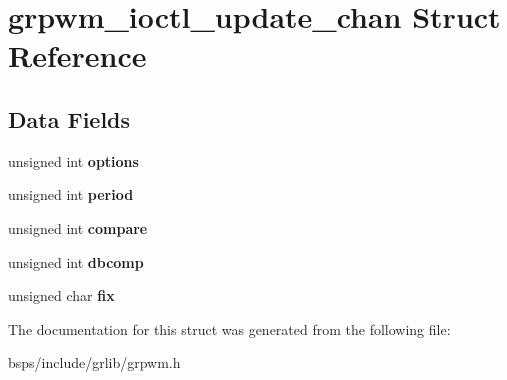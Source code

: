 \hypertarget{structgrpwm__ioctl__update__chan}{}\section{grpwm\+\_\+ioctl\+\_\+update\+\_\+chan Struct Reference}
\label{structgrpwm__ioctl__update__chan}
\subsection*{Data Fields}
\begin{DoxyCompactItemize}
\item 
\mbox{\label{structgrpwm__ioctl__update__chan_a0df084013ac1e6cd9d66efe2cc3f1d44}} 
unsigned int {\bfseries options}
\item 
\mbox{\label{structgrpwm__ioctl__update__chan_ab3a5982787c6750e154e57e57f1d91b9}} 
unsigned int {\bfseries period}
\item 
\mbox{\label{structgrpwm__ioctl__update__chan_a348531f8d33e8bb7bc12959e7c21b621}} 
unsigned int {\bfseries compare}
\item 
\mbox{\label{structgrpwm__ioctl__update__chan_a1b1dcb7403a929a11f58afe656229c2d}} 
unsigned int {\bfseries dbcomp}
\item 
\mbox{\label{structgrpwm__ioctl__update__chan_a6f867f094678a7f372d13ca398044253}} 
unsigned char {\bfseries fix}
\end{DoxyCompactItemize}


The documentation for this struct was generated from the following file\+:\begin{DoxyCompactItemize}
\item 
bsps/include/grlib/grpwm.\+h\end{DoxyCompactItemize}
